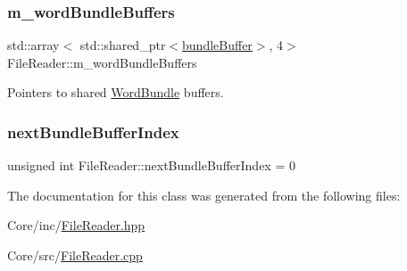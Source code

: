 \mbox{\label{class_file_reader_a038d1362d7e0458b3450ab8584eab688}} 
\subsubsection{\texorpdfstring{m\+\_\+word\+Bundle\+Buffers}{m\_wordBundleBuffers}}
{\footnotesize\ttfamily std\+::array$<$ std\+::shared\+\_\+ptr$<$\hyperlink{class_file_reader_ac755c1e271610c2c12a7fc5b55cc048b}{bundle\+Buffer}$>$, 4$>$ File\+Reader\+::m\+\_\+word\+Bundle\+Buffers\hspace{0.3cm}{\ttfamily [private]}}



Pointers to shared \hyperlink{class_word_bundle}{Word\+Bundle} buffers. 

\mbox{\label{class_file_reader_a44215632cb0ae7ee51991eb3213d03bf}} 
\subsubsection{\texorpdfstring{next\+Bundle\+Buffer\+Index}{nextBundleBufferIndex}}
{\footnotesize\ttfamily unsigned int File\+Reader\+::next\+Bundle\+Buffer\+Index = 0\hspace{0.3cm}{\ttfamily [private]}}



The documentation for this class was generated from the following files\+:\begin{DoxyCompactItemize}
\item 
Core/inc/\hyperlink{_file_reader_8hpp}{File\+Reader.\+hpp}\item 
Core/src/\hyperlink{_file_reader_8cpp}{File\+Reader.\+cpp}\end{DoxyCompactItemize}
